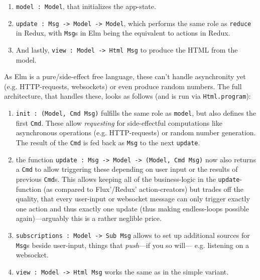 \begin{enumerate}
    \item \texttt{model : Model}, that initializes the app-state.
    \item \texttt{update : Msg -> Model -> Model}, which performs the same role as \texttt{reduce} in Redux, with \texttt{Msg}s in Elm being the equivalent to actions in Redux.
    \item And lastly, \texttt{view : Model -> Html Msg} to produce the HTML from the model.
\end{enumerate}

As Elm is a pure/side-effect free language, these can't handle asynchronity yet (e.g. HTTP-requests, websockets) or even produce random numbers. The full architecture, that handles these, looks as follows (and is run via \texttt{Html.program}):

\begin{enumerate}
    \item \texttt{init : (Model, Cmd Msg)} fulfills the same role as \texttt{model}, but also defines the first \texttt{Cmd}. These allow \textit{requesting} for side-effectful computations like asynchronous operations (e.g. HTTP-requests) or random number generation. The result of the \texttt{Cmd} is fed back as \texttt{Msg} to the next \texttt{update}.
    \item the function \texttt{update : Msg -> Model -> (Model, Cmd Msg)} now also returns a \texttt{Cmd} to allow triggering these depending on user input or the results of previous \texttt{Cmd}s. This allows keeping all of the business-logic in the \texttt{update}-function (as compared to Flux'/Redux' action-creators) but trades off the quality, that every user-input or websocket message can only trigger exactly one action and thus exactly one update (thus making endless-loops
        possible again)---arguably this is a rather neglible price.
    \item \texttt{subscriptions : Model -> Sub Msg} allows to set up additional sources for \texttt{Msg}s beside user-input, things that \textit{push}---if you so will---
e.g. listening on a websocket.
    \item \texttt{view : Model -> Html Msg} works the same as in the simple variant.
\end{enumerate}

